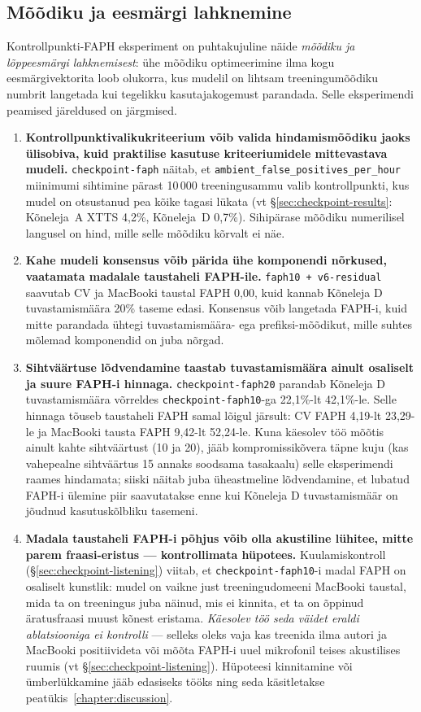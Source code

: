 \subsection{Mõõdiku ja eesmärgi lahknemine}
\label{sec:checkpoint-conclusion}

Kontrollpunkti-FAPH eksperiment on puhtakujuline näide \emph{mõõdiku ja lõppeesmärgi lahknemisest}: ühe mõõdiku optimeerimine ilma kogu eesmärgivektorita loob olukorra, kus mudelil on lihtsam treeningumõõdiku numbrit langetada kui tegelikku kasutajakogemust parandada. Selle eksperimendi peamised järeldused on järgmised.

\begin{enumerate}
    \item \textbf{Kontrollpunktivalikukriteerium võib valida hindamismõõdiku jaoks ülisobiva, kuid praktilise kasutuse kriteeriumidele mittevastava mudeli.} \texttt{checkpoint-faph} näitab, et \texttt{ambient\_false\_positives\_per\_hour} miinimumi sihtimine pärast 10\,000 treeningusammu valib kontrollpunkti, kus mudel on otsustanud pea kõike tagasi lükata (vt §\ref{sec:checkpoint-results}: Kõneleja~A XTTS 4,2\%, Kõneleja~D 0,7\%). Sihipärase mõõdiku numerilisel langusel on hind, mille selle mõõdiku kõrvalt ei näe.
    \item \textbf{Kahe mudeli konsensus võib pärida ühe komponendi nõrkused, vaatamata madalale taustaheli FAPH-ile.} \texttt{faph10 + v6-residual} saavutab CV ja MacBooki taustal FAPH 0,00, kuid kannab Kõneleja D tuvastamismäära 20\% taseme edasi. Konsensus võib langetada FAPH-i, kuid mitte parandada ühtegi tuvastamismäära- ega prefiksi-mõõdikut, mille suhtes mõlemad komponendid on juba nõrgad.
    \item \textbf{Sihtväärtuse lõdvendamine taastab tuvastamismäära ainult osaliselt ja suure FAPH-i hinnaga.} \texttt{checkpoint-faph20} parandab Kõneleja D tuvastamismäära võrreldes \texttt{checkpoint-faph10}-ga 22,1\%-lt 42,1\%-le. Selle hinnaga tõuseb taustaheli FAPH samal lõigul järsult: CV FAPH 4,19-lt 23,29-le ja MacBooki tausta FAPH 9,42-lt 52,24-le. Kuna käesolev töö mõõtis ainult kahte sihtväärtust (10 ja 20), jääb kompromissikõvera täpne kuju (kas vahepealne sihtväärtus 15 annaks soodsama tasakaalu) selle eksperimendi raames hindamata; siiski näitab juba üheastmeline lõdvendamine, et lubatud FAPH-i ülemine piir saavutatakse enne kui Kõneleja D tuvastamismäär on jõudnud kasutuskõlbliku tasemeni.
    \item \textbf{Madala taustaheli FAPH-i põhjus võib olla akustiline lühitee, mitte parem fraasi-eristus --- kontrollimata hüpotees.} Kuulamiskontroll (§\ref{sec:checkpoint-listening}) viitab, et \texttt{checkpoint-faph10}-i madal FAPH on osaliselt kunstlik: mudel on vaikne just treeningudomeeni MacBooki taustal, mida ta on treeningus juba näinud, mis ei kinnita, et ta on õppinud äratusfraasi muust kõnest eristama. \emph{Käesolev töö seda väidet eraldi ablatsiooniga ei kontrolli} --- selleks oleks vaja kas treenida ilma autori ja MacBooki positiivideta või mõõta FAPH-i uuel mikrofonil teises akustilises ruumis (vt §\ref{sec:checkpoint-listening}). Hüpoteesi kinnitamine või ümberlükkamine jääb edasiseks tööks ning seda käsitletakse peatükis~\ref{chapter:discussion}.
\end{enumerate}

